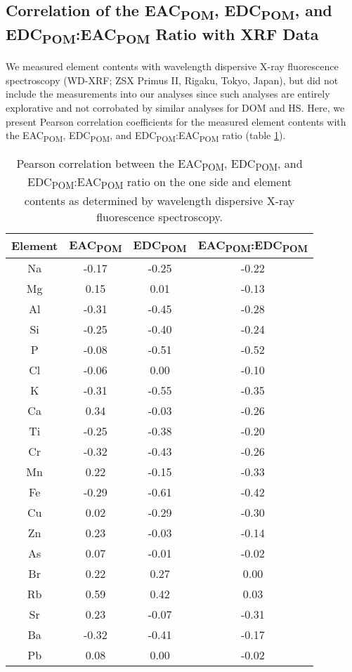 \documentclass[alpha-refs, lineno]{wiley-article-rmd}
\begin{document}
\hypertarget{correlation-of-the-eac-edc-and-edceac-ratio-with-xrf-data}{%
\subsection{\texorpdfstring{Correlation of the EAC\textsubscript{POM}, EDC\textsubscript{POM}, and EDC\textsubscript{POM}:EAC\textsubscript{POM} Ratio with XRF Data}{Correlation of the EAC, EDC, and EDC:EAC Ratio with XRF Data}}\label{correlation-of-the-eac-edc-and-edceac-ratio-with-xrf-data}}

We measured element contents with wavelength dispersive X-ray fluorescence spectroscopy (WD-XRF; ZSX Primus II, Rigaku, Tokyo, Japan), but did not include the measurements into our analyses since such analyses are entirely explorative and not corrobated by similar analyses for DOM and HS. Here, we present Pearson correlation coefficients for the measured element contents with the EAC\textsubscript{POM}, EDC\textsubscript{POM}, and EDC\textsubscript{POM}:EAC\textsubscript{POM} ratio (table \ref{tab:t-cor-el-xrf}).

\begin{table}

\caption{\label{tab:t-cor-el-xrf}Pearson correlation between the EAC\textsubscript{POM}, EDC\textsubscript{POM}, and EDC\textsubscript{POM}:EAC\textsubscript{POM} ratio on the one side and element contents as determined by wavelength dispersive X-ray fluorescence spectroscopy.}
\centering
\begin{tabular}[t]{cccc}
\toprule
Element & EAC\textsubscript{POM} & EDC\textsubscript{POM} & EAC\textsubscript{POM}:EDC\textsubscript{POM}\\
\midrule
Na & -0.17 & -0.25 & -0.22\\
Mg & 0.15 & 0.01 & -0.13\\
Al & -0.31 & -0.45 & -0.28\\
Si & -0.25 & -0.40 & -0.24\\
P & -0.08 & -0.51 & -0.52\\
\addlinespace
Cl & -0.06 & 0.00 & -0.10\\
K & -0.31 & -0.55 & -0.35\\
Ca & 0.34 & -0.03 & -0.26\\
Ti & -0.25 & -0.38 & -0.20\\
Cr & -0.32 & -0.43 & -0.26\\
\addlinespace
Mn & 0.22 & -0.15 & -0.33\\
Fe & -0.29 & -0.61 & -0.42\\
Cu & 0.02 & -0.29 & -0.30\\
Zn & 0.23 & -0.03 & -0.14\\
As & 0.07 & -0.01 & -0.02\\
\addlinespace
Br & 0.22 & 0.27 & 0.00\\
Rb & 0.59 & 0.42 & 0.03\\
Sr & 0.23 & -0.07 & -0.31\\
Ba & -0.32 & -0.41 & -0.17\\
Pb & 0.08 & 0.00 & -0.02\\
\bottomrule
\end{tabular}
\end{table}
\end{document}
